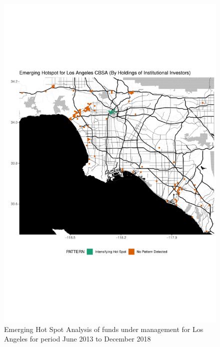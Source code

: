 \begin{figure}
	\centering
	\includegraphics[width=1\linewidth]{Figures/ChapterIV/LA_Money_EH}
	\caption[Emerging Hot Spot Analysis of Funds Under Management for Los Angeles CBSA 2013-2018]{Emerging Hot Spot Analysis of funds under management for Los Angeles for period June 2013 to December 2018}
	\label{fig:LAmoneyhotspot}
\end{figure}

